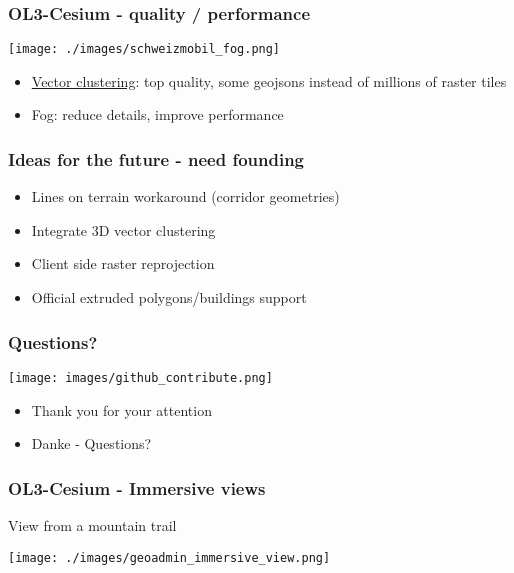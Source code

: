 \documentclass[handout]{beamer}
\begin{document}
  \begin{frame}
    \frametitle{OL3-Cesium - quality / performance}
    \begin{center}
      \texttt{[image: ./images/schweizmobil\_fog.png]}
    \end{center}

    \begin{itemize}
     \pause\item \href {https://github.com/gberaudo/ol3-cluster-tool}{Vector clustering}: top quality, some geojsons instead of millions of raster tiles
     \pause\item Fog: reduce details, improve performance
    \end{itemize}
  \end{frame}


  \begin{frame}
    \frametitle{Ideas for the future - need founding}
    \begin{itemize}
      \pause\item Lines on terrain workaround (corridor geometries)
      \pause\item Integrate 3D vector clustering
      \pause\item Client side raster reprojection
      \pause\item Official extruded polygons/buildings support
    \end{itemize}
  \end{frame}


  \begin{frame}
    \frametitle{Questions?}
    \vspace{-20pt}\begin{center}
      \texttt{[image: images/github\_contribute.png]}
    \end{center}
    \begin{itemize}
      \item Thank you for your attention
      \item Danke - Questions?
    \end{itemize}
  \end{frame}


  \begin{frame}
    \frametitle{OL3-Cesium - Immersive views}
    View from a mountain trail
    \begin{center}
      \texttt{[image: ./images/geoadmin\_immersive\_view.png]}
    \end{center}
  \end{frame}
\end{document}
